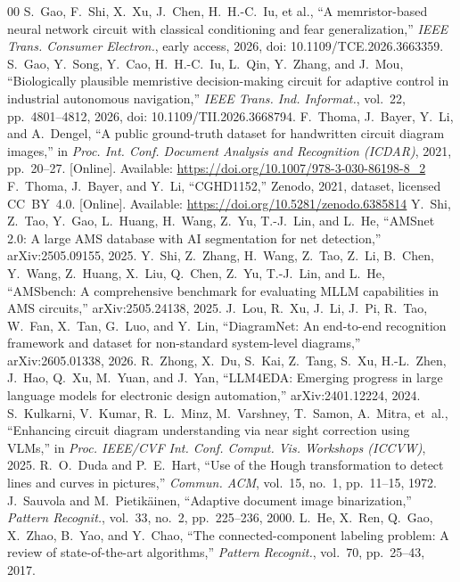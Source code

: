 \documentclass{ieeeaccess}
\begin{document}
\begin{thebibliography}{00}
 S.~Gao, F.~Shi, X.~Xu, J.~Chen, H.~H.-C.~Iu, et al., ``A memristor-based neural network circuit with classical conditioning and fear generalization,'' \textit{IEEE Trans. Consumer Electron.}, early access, 2026, doi: 10.1109/TCE.2026.3663359.
 S.~Gao, Y.~Song, Y.~Cao, H.~H.-C.~Iu, L.~Qin, Y.~Zhang, and J.~Mou, ``Biologically plausible memristive decision-making circuit for adaptive control in industrial autonomous navigation,'' \textit{IEEE Trans. Ind. Informat.}, vol.~22, pp.~4801--4812, 2026, doi: 10.1109/TII.2026.3668794.
 F.~Thoma, J.~Bayer, Y.~Li, and A.~Dengel, ``A public ground-truth dataset for handwritten circuit diagram images,'' in \textit{Proc. Int. Conf. Document Analysis and Recognition (ICDAR)}, 2021, pp.~20--27. [Online]. Available: \url{https://doi.org/10.1007/978-3-030-86198-8_2}
 F.~Thoma, J.~Bayer, and Y.~Li, ``CGHD1152,'' Zenodo, 2021, dataset, licensed CC~BY~4.0. [Online]. Available: \url{https://doi.org/10.5281/zenodo.6385814}
 Y.~Shi, Z.~Tao, Y.~Gao, L.~Huang, H.~Wang, Z.~Yu, T.-J.~Lin, and L.~He, ``AMSnet 2.0: A large AMS database with AI segmentation for net detection,'' arXiv:2505.09155, 2025.
 Y.~Shi, Z.~Zhang, H.~Wang, Z.~Tao, Z.~Li, B.~Chen, Y.~Wang, Z.~Huang, X.~Liu, Q.~Chen, Z.~Yu, T.-J.~Lin, and L.~He, ``AMSbench: A comprehensive benchmark for evaluating MLLM capabilities in AMS circuits,'' arXiv:2505.24138, 2025.
 J.~Lou, R.~Xu, J.~Li, J.~Pi, R.~Tao, W.~Fan, X.~Tan, G.~Luo, and Y.~Lin, ``DiagramNet: An end-to-end recognition framework and dataset for non-standard system-level diagrams,'' arXiv:2605.01338, 2026.
 R.~Zhong, X.~Du, S.~Kai, Z.~Tang, S.~Xu, H.-L.~Zhen, J.~Hao, Q.~Xu, M.~Yuan, and J.~Yan, ``LLM4EDA: Emerging progress in large language models for electronic design automation,'' arXiv:2401.12224, 2024.
 S.~Kulkarni, V.~Kumar, R.~L.~Minz, M.~Varshney, T.~Samon, A.~Mitra, et~al., ``Enhancing circuit diagram understanding via near sight correction using VLMs,'' in \textit{Proc. IEEE/CVF Int. Conf. Comput. Vis. Workshops (ICCVW)}, 2025.
 R.~O.~Duda and P.~E.~Hart, ``Use of the Hough transformation to detect lines and curves in pictures,'' \textit{Commun. ACM}, vol.~15, no.~1, pp.~11--15, 1972.
 J.~Sauvola and M.~Pietik\"{a}inen, ``Adaptive document image binarization,'' \textit{Pattern Recognit.}, vol.~33, no.~2, pp.~225--236, 2000.
 L.~He, X.~Ren, Q.~Gao, X.~Zhao, B.~Yao, and Y.~Chao, ``The connected-component labeling problem: A review of state-of-the-art algorithms,'' \textit{Pattern Recognit.}, vol.~70, pp.~25--43, 2017.

\end{thebibliography}
\end{document}
